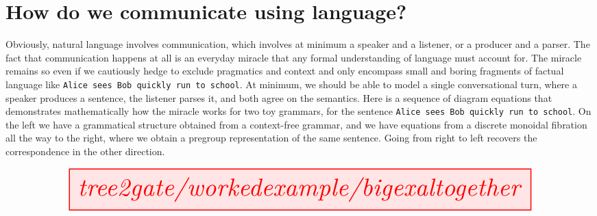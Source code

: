 \section{How do we communicate using language?}


 Obviously, natural language involves communication, which involves at minimum a speaker and a listener, or a producer and a parser. The fact that communication happens at all is an everyday miracle that any formal understanding of language must account for. The miracle remains so even if we cautiously hedge to exclude pragmatics and context and only encompass small and boring fragments of factual language like \texttt{Alice sees Bob quickly run to school}. At minimum, we should be able to model a single conversational turn, where a speaker produces a sentence, the listener parses it, and both agree on the semantics. Here is a sequence of diagram equations that demonstrates mathematically how the miracle works for two toy grammars, for the sentence \texttt{Alice sees Bob quickly run to school}. On the left we have a grammatical structure obtained from a context-free grammar, and we have equations from a discrete monoidal fibration all the way to the right, where we obtain a pregroup representation of the same sentence. Going from right to left recovers the correspondence in the other direction.

\[\resizebox{1.5\textwidth}{!}{\tikzfig{tree2gate/workedexample/bigexaltogether}}\]

